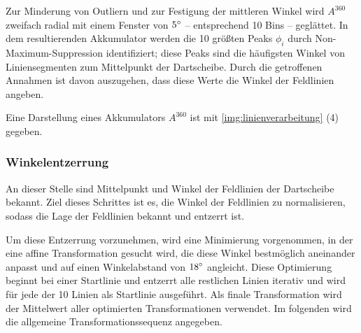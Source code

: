 Zur Minderung von Outliern und zur Festigung der mittleren Winkel wird $A^{360}$ zweifach radial mit einem Fenster von $5^{\circ}$ -- entsprechend 10 Bins -- geglättet. In dem resultierenden Akkumulator werden die 10 größten Peaks $\phi_i$ durch Non-Maximum-Suppression identifiziert; diese Peaks sind die häufigsten Winkel von Liniensegmenten zum Mittelpunkt der Dartscheibe. Durch die getroffenen Annahmen ist davon auszugehen, dass diese Werte die Winkel der Feldlinien angeben.

Eine Darstellung eines Akkumulators $A^{360}$ ist mit \autoref{img:linienverarbeitung} (4) gegeben.

\subsubsection{Winkelentzerrung}
\label{sec:winkelentzerrung}

An dieser Stelle sind Mittelpunkt und Winkel der Feldlinien der Dartscheibe bekannt. Ziel dieses Schrittes ist es, die Winkel der Feldlinien zu normalisieren, sodass die Lage der Feldlinien bekannt und entzerrt ist.

Um diese Entzerrung vorzunehmen, wird eine Minimierung vorgenommen, in der eine affine Transformation gesucht wird, die diese Winkel bestmöglich aneinander anpasst und auf einen Winkelabstand von $18^{\circ}$ angleicht. Diese Optimierung beginnt bei einer Startlinie und entzerrt alle restlichen Linien iterativ und wird für jede der 10 Linien als Startlinie ausgeführt. Als finale Transformation wird der Mittelwert aller optimierten Transformationen verwendet. Im folgenden wird die allgemeine Transformationssequenz angegeben.

